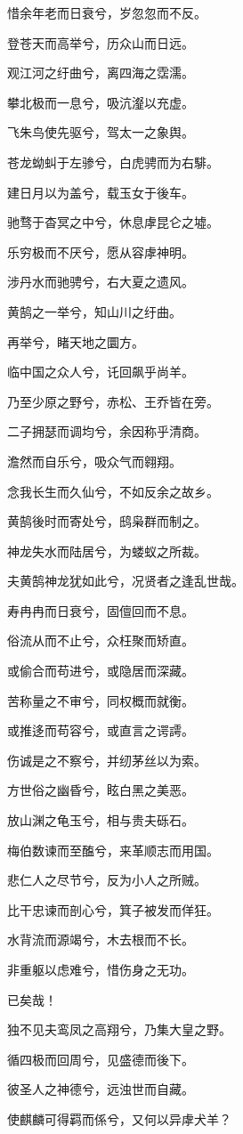 \documentclass[UTF8,titlepage,oneside]{ctexbook}
\begin{document}
\begin{center}
	
	惜余年老而日衰兮，岁忽忽而不反。
	
	登苍天而高举兮，历众山而日远。
	
	观江河之纡曲兮，离四海之霑濡。
	
	攀北极而一息兮，吸沆瀣以充虚。
	
	飞朱鸟使先驱兮，驾太一之象舆。
	
	苍龙蚴虯于左骖兮，白虎骋而为右騑。
	
	建日月以为盖兮，载玉女于後车。
	
	驰骛于杳冥之中兮，休息虖昆仑之墟。
	
	乐穷极而不厌兮，愿从容虖神明。
	
	涉丹水而驰骋兮，右大夏之遗风。
	
	黄鹄之一举兮，知山川之纡曲。
	
	再举兮，睹天地之圜方。
	
	临中国之众人兮，讬回飙乎尚羊。
	
	乃至少原之野兮，赤松、王乔皆在旁。
	
	二子拥瑟而调均兮，余因称乎清商。
	
	澹然而自乐兮，吸众气而翱翔。
	
	念我长生而久仙兮，不如反余之故乡。
	
	
	黄鹄後时而寄处兮，鸱枭群而制之。
	
	神龙失水而陆居兮，为蝼蚁之所裁。
	
	夫黄鹄神龙犹如此兮，况贤者之逢乱世哉。
	
	寿冉冉而日衰兮，固儃回而不息。
	
	俗流从而不止兮，众枉聚而矫直。
	
	或偷合而苟进兮，或隐居而深藏。
	
	苦称量之不审兮，同权概而就衡。
	
	或推迻而苟容兮，或直言之谔謣。
	
	伤诚是之不察兮，并纫茅丝以为索。
	
	方世俗之幽昏兮，眩白黑之美恶。
	
	放山渊之龟玉兮，相与贵夫砾石。
	
	梅伯数谏而至醢兮，来革顺志而用国。
	
	悲仁人之尽节兮，反为小人之所贼。
	
	比干忠谏而剖心兮，箕子被发而佯狂。
	
	水背流而源竭兮，木去根而不长。
	
	非重躯以虑难兮，惜伤身之无功。
	
	
	已矣哉！
	
	独不见夫鸾凤之高翔兮，乃集大皇之野。
	
	循四极而回周兮，见盛德而後下。
	
	彼圣人之神德兮，远浊世而自藏。
	
	使麒麟可得羁而係兮，又何以异虖犬羊？
	
\end{center}
\end{document}
